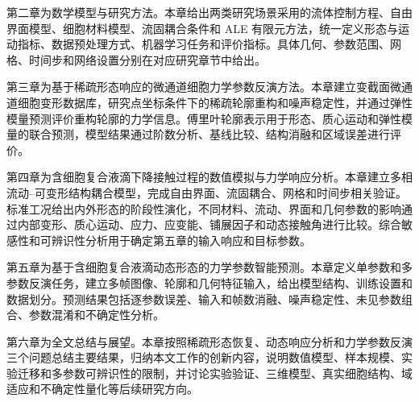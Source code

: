 第二章为数学模型与研究方法。本章给出两类研究场景采用的流体控制方程、自由界面模型、细胞材料模型、流固耦合条件和 ALE 有限元方法，统一定义形态与运动指标、数据预处理方式、机器学习任务和评价指标。具体几何、参数范围、网格、时间步和网络设置分别在对应研究章节中给出。

第三章为基于稀疏形态响应的微通道细胞力学参数反演方法。本章建立变截面微通道细胞变形数据库，研究点坐标条件下的稀疏轮廓重构和噪声稳定性，并通过弹性模量预测评价重构轮廓的力学信息。傅里叶轮廓表示用于形态、质心运动和弹性模量的联合预测，模型结果通过阶数分析、基线比较、结构消融和区域误差进行评价。

第四章为含细胞复合液滴下降接触过程的数值模拟与力学响应分析。本章建立多相流动--可变形结构耦合模型，完成自由界面、流固耦合、网格和时间步相关验证。标准工况给出内外形态的阶段性演化，不同材料、流动、界面和几何参数的影响通过内部变形、质心运动、应力、应变能、铺展因子和动态接触角进行比较。综合敏感性和可辨识性分析用于确定第五章的输入响应和目标参数。

第五章为基于含细胞复合液滴动态形态的力学参数智能预测。本章定义单参数和多参数反演任务，建立多帧图像、轮廓和几何特征输入，给出模型结构、训练设置和数据划分。预测结果包括逐参数误差、输入和帧数消融、噪声稳定性、未见参数组合、参数混淆和不确定性分析。

第六章为全文总结与展望。本章按照稀疏形态恢复、动态响应分析和力学参数反演三个问题总结主要结果，归纳本文工作的创新内容，说明数值模型、样本规模、实验迁移和多参数可辨识性的限制，并讨论实验验证、三维模型、真实细胞结构、域适应和不确定性量化等后续研究方向。
